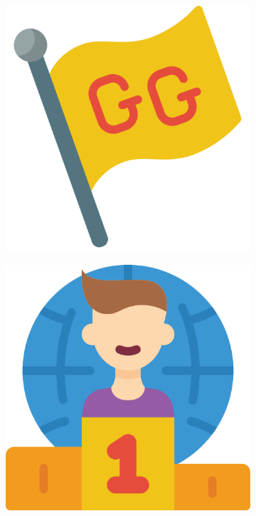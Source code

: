 \begin{figure}[h]
\begin{subfigure}{.1\textwidth}
        \includegraphics[width=.8\linewidth]{images/icons/030-flag.png}
    \end{subfigure}
    \begin{subfigure}{.1\textwidth}
        \centering
        \includegraphics[width=.8\linewidth]{images/icons/052-rank.png}
    \end{subfigure}
    \begin{subfigure}{.1\textwidth}
        \centering

\end{subfigure}
\end{figure}
